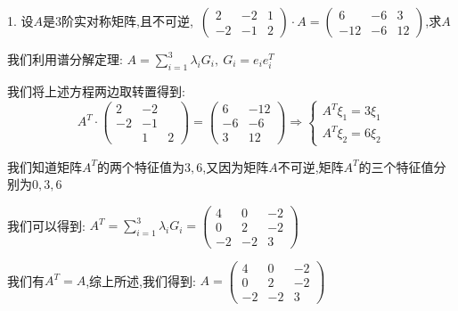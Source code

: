 1. 设$A$是$3$阶实对称矩阵,且不可逆,\ $\left(\begin{matrix}
	2&-2&1\\-2&-1&2
\end{matrix} \right)\cdot A=\left(\begin{matrix}
6&-6&3\\-12&-6&12
\end{matrix} \right) $,求$A$
\begin{solution}

	我们利用谱分解定理:  $A=\sum\limits_{i=1}^{3}\lambda_{i}G_{i},\ G_{i}=e_{i}e_{i}^{T}$
	
	我们将上述方程两边取转置得到:  
	$$A^{T}\cdot\left(\begin{matrix}
		2&-2\\-2&-1\\&1&2
	\end{matrix} \right)=\left(\begin{matrix}
	6&-12\\-6&-6\\3&12
\end{matrix} \right)\Rightarrow \left\lbrace
\begin{array}{l}
A^{T}\xi_{1}=3\xi_{1}\\
A^{T}\xi_{2}=6\xi_{2}
\end{array}
\right. $$

我们知道矩阵$A^{T}$的两个特征值为$3,6$,又因为矩阵$A$不可逆,矩阵$A^{T}$的三个特征值分别为$0,3,6$

我们可以得到:  $A^{T}=\sum\limits_{i=1}^{3}\lambda_{i}G_{i}=\left(\begin{matrix}
	4&0&-2\\0&2&-2\\-2&-2&3
\end{matrix} \right)$

我们有$A^{T}=A$,综上所述,我们得到:  $A=\left(\begin{matrix}
	4&0&-2\\0&2&-2\\-2&-2&3
\end{matrix} \right)$
\end{solution}


